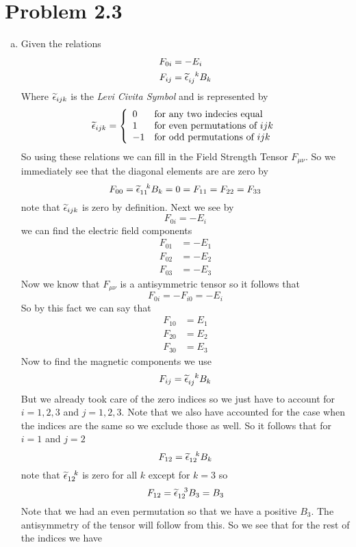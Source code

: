 \documentclass[11pt]{article}
\numberwithin{equation}{section}
\begin{document}
\section{Problem 2.3}
\begin{enumerate}[(a)]
\item
Given the relations
\begin{align}
F_{0i} &= -E_i\\
F_{ij} &= \widetilde{\epsilon}_{ij}^{\ \ k}B_k
\end{align}
Where $\widetilde{\epsilon}_{ijk}$ is the \emph{Levi Civita Symbol} and is represented by
$$\widetilde{\epsilon}_{ijk} = \left\{\begin{array}{ll}
			0	&\textnormal{for any two indecies equal}\\ 
			1	&\textnormal{for even permutations of}\ ijk\\
			-1	&\textnormal{for odd permutations of}\ ijk\\
		\end{array}\right.$$
So using these relations we can fill in the Field Strength Tensor $F_{\mu\nu}$. So we immediately see that the diagonal elements are are zero by
$$F_{00} = \widetilde{\epsilon}_{11}^{\ \ k}B_k = 0 = F_{11} = F_{22} =F_{33}$$
note that $\widetilde{\epsilon}_{ijk}$ is zero by definition. Next we see by
$$F_{0i} = -E_i$$
we can find the electric field components 
\begin{align*}
F_{01} &= -E_1\\
F_{02} &= -E_2\\
F_{03} &= -E_3
\end{align*}
Now we know that $F_{\mu\nu}$ is a antisymmetric tensor so it follows that
$$F_{0i} = -F_{i0} = -E_i$$
So by this fact we can say that 
\begin{align*}
F_{10} &= E_1\\
F_{20} &= E_2\\
F_{30} &= E_3
\end{align*}
Now to find the magnetic components we use 
$$F_{ij} = \levi_{ij}^{\ \ k}B_k$$
But we already took care of the zero indices so we just have to account for $i =1,2,3$ and $j=1,2,3$. Note that we also have accounted for the case when the indices are the same so we exclude those as well. So it follows that for $i=1$ and $j=2$
$$F_{12} = \widetilde{\epsilon}_{12}^{\ \ k}B_k$$
note that $\widetilde{\epsilon}_{12}^{\ \ k}$ is zero for all $k$ except for $k=3$ so
$$F_{12} = \widetilde{\epsilon}_{12}^{\ \ 3}B_3 = B_3$$
Note that we had an even permutation so that we have a positive $B_3$. The antisymmetry of the tensor will follow from this. So we see that for the rest of the indices we have
\begin{align*}

\end{align*}
\end{enumerate}
\end{document}
